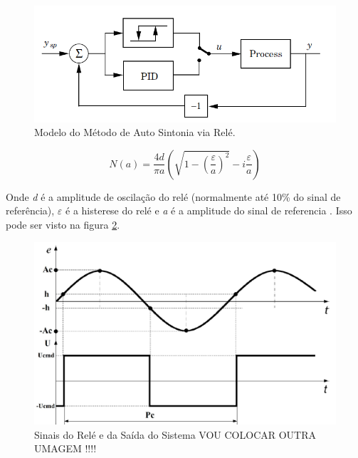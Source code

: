 \begin{figure}[!ht]
  \caption{Modelo do Método de Auto Sintonia via Relé.}
  \begin{center}
      \includegraphics[scale=0.75]{img/pid_autotuning_relay_astrom_p239}
  \end{center}
  \label{fig:pid_autotuning_relay_astrom_p239}
\end{figure}

\begin{equation}\label{eq:n(a)}
  N(a)=\frac{4d}{\pi a}\left(\sqrt{1-\left(\frac{\varepsilon}{a}\right)^{2}}-i\frac{\varepsilon}{a}\right) 
\end{equation}

Onde \textit{d} é a amplitude de oscilação do relé (normalmente até 10\% do sinal de referência), \textit{$\varepsilon$} é a histerese do relé e \textit{a} é a amplitude do sinal de referencia \cite{Levine1996}. Isso pode ser visto na figura \ref{fig:relay_signals}.

\begin{figure}[!ht]
  \caption{Sinais do Relé e da Saída do Sistema  VOU COLOCAR OUTRA UMAGEM !!!!}
  \begin{center}
      \includegraphics[scale=0.75]{img/relay_giap_p2}
  \end{center}
  \label{fig:relay_signals}
\end{figure}


